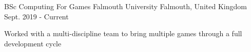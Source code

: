 

\begin{cventries}

  \cventry
    {BSc Computing For Games} %
    {Falmouth University} %
    {Falmouth, United Kingdom} %
    {Sept. 2019 - Current} %
    {
      \begin{cvitems} %
        \item Worked with a multi-discipline team to bring multiple games through a full development cycle
      \end{cvitems}
    }

\end{cventries}
